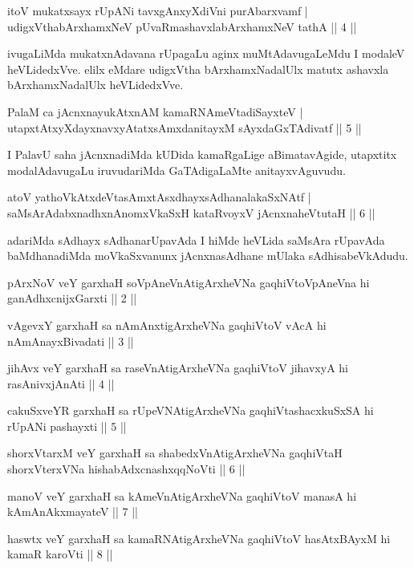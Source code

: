 \begin{shl}
itoV mukatxsayx rUpANi tavxgAnxyXdiVni purA\s barxvamf |\\
udigxVthabArxhamxNeV pUvaRmashavxlabArxhamxNeV tathA \hfill || 4 ||
\end{shl}

\begin{artha}
ivugaLiMda mukatxnAdavana rUpagaLu aginx muMtAdavugaLeMdu I modaleV heVLidedxVve. elilx eMdare udigxVtha bArxhamxNadalUlx matutx ashavxla bArxhamxNadalUlx heVLidedxVve.
\end{artha}


\begin{shl}
PalaM ca jAcnxnayukAtxnAM kamaRNAmeVtadiSayxteV |\\
utapxtAtxyXdayxnavxyAtatxsAmxdanitayxM sAyxdaGxTAdivatf \hfill || 5 ||
\end{shl}

\begin{artha}
I PalavU saha jAcnxnadiMda kUDida kamaRgaLige aBimatavAgide, utapxtitx modalAdavugaLu iruvudariMda GaTAdigaLaMte anitayxvAguvudu.
\end{artha}

\begin{shl}
atoV yathoVkAtxdeVtasAmxtAsxdhayxsAdhanalakaSxNAtf |\\
saMsArAdabxnadhxnAnomxVkaSxH kataRvoyxV jAcnxnaheVtutaH \hfill || 6 ||
\end{shl}

\begin{artha}
adariMda sAdhayx sAdhanarUpavAda I hiMde heVLida saMsAra rUpavAda baMdhanadiMda moVkaSxvanunx jAcnxnasAdhane mUlaka sAdhisabeVkAdudu.
\end{artha}


\begin{kandikeshl}
pArxNoV veY garxhaH soV\s pAneVnAtigArxheVNa gaqhiVtoV\s pAneVna hi ganAdhxcnijxGarxti || 2 ||

vAgevxY garxhaH sa nAmAnxtigArxheVNa gaqhiVtoV vAcA hi nAmAnayxBivadati || 3 ||

jihAvx veY garxhaH sa raseVnAtigArxheVNa gaqhiVtoV jihavxyA hi rasAnivxjAnAti || 4 ||

cakuSxveYR garxhaH sa rUpeVNAtigArxheVNa gaqhiVtashacxkuSxSA hi rUpANi pashayxti || 5 ||

shorxVtarxM veY garxhaH sa shabedxVnAtigArxheVNa gaqhiVtaH shorxVterxVNa hi\break shabAdxcnashxqqNoVti || 6 ||

manoV veY garxhaH sa kAmeVnAtigArxheVNa gaqhiVtoV manasA hi kAmAnAkxmayateV || 7 ||

haswtx veY garxhaH sa kamaRNAtigArxheVNa gaqhiVtoV hasAtxBAyxM hi kamaR karoVti || 8 ||
\end{kandikeshl}

